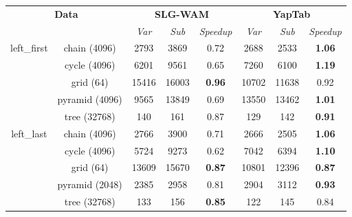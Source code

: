 \begin{table}[ht]
\centering
\footnotesize{
  \begin{tabular}{cc|ccc|ccc}
   \hline
    \hline
    \multicolumn{2}{c|}{\multirow{2}{*}{\small{\textbf{Data}}}} & \multicolumn{3}{c|}{\small{\textbf{SLG-WAM}}} & \multicolumn{3}{c}{\small{\textbf{YapTab}}} \\
     \multicolumn{2}{c|}{} & \textit{Var} & \textit{Sub} & \textit{Speedup} & \textit{Var} & \textit{Sub} & \textit{Speedup} \\
   \hline
   \hline

   \multirow{5}{*}{left\_first} &  \scriptsize{chain  (4096) }  &  2793 & 3869 &  0.72  & 2688 & 2533 &  \textbf{1.06} \\
   &  \scriptsize{cycle  (4096) }  &  6201 & 9561 &  0.65  & 7260 & 6100 &  \textbf{1.19} \\
   &  \scriptsize{grid  (64) }  &  15416 & 16003 &  \textbf{0.96}  & 10702 & 11638 &  0.92 \\
   &  \scriptsize{pyramid  (4096) }  &  9565 & 13849 &  0.69  & 13550 & 13462 &  \textbf{1.01} \\
   &  \scriptsize{tree  (32768) }  &  140 & 161 &  0.87  & 129 & 142 &  \textbf{0.91} \\
   \hline
   \multirow{5}{*}{left\_last} &  \scriptsize{chain  (4096) }  &  2766 & 3900 &  0.71  & 2666 & 2505 &  \textbf{1.06} \\
   &  \scriptsize{cycle  (4096) }  &  5724 & 9273 &  0.62  & 7042 & 6394 &  \textbf{1.10} \\
   &  \scriptsize{grid  (64) }  &  13609 & 15670 &  \textbf{0.87}  & 10801 & 12396 &  \textbf{0.87} \\
   &  \scriptsize{pyramid  (2048) }  &  2385 & 2958 &  0.81  & 2904 & 3112 &  \textbf{0.93} \\
   &  \scriptsize{tree  (32768) }  &  133 & 156 &  \textbf{0.85}  & 122 & 145 &  0.84 \\
   \hline


\end{tabular}}
\end{table}
